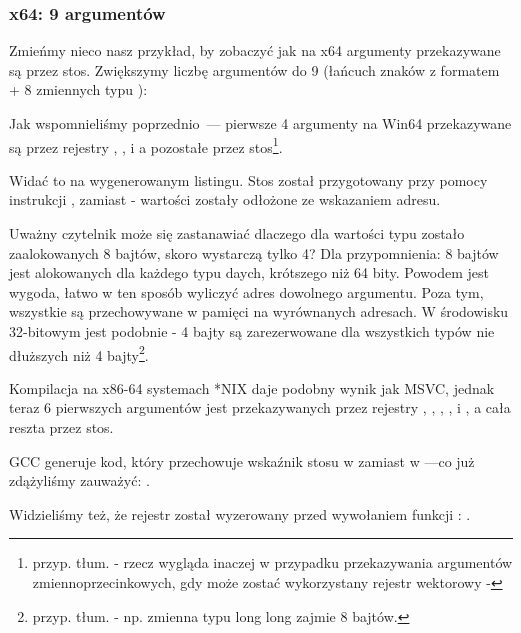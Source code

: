 \subsubsection{x64: 9 argumentów}

\label{example_printf8_x64}
Zmieńmy nieco nasz przykład, by zobaczyć jak na x64 argumenty przekazywane są przez stos.
Zwiększymy liczbę argumentów do 9 (łańcuch znaków z formatem + 8 zmiennych typu \Tint):




Jak wspomnieliśmy poprzednio~--- pierwsze 4 argumenty na Win64 przekazywane są przez rejestry \RCX, \RDX,  i  a pozostałe przez stos\footnote{przyp. tłum. - rzecz wygląda inaczej w przypadku przekazywania argumentów zmiennoprzecinkowych, gdy może zostać wykorzystany rejestr wektorowy -}.

Widać to na wygenerowanym listingu. Stos został przygotowany przy pomocy instrukcji \MOV, zamiast \PUSH - wartości zostały odłożone ze wskazaniem adresu.



Uważny czytelnik może się zastanawiać dlaczego dla wartości typu \Tint zostało zaalokowanych 8 bajtów, skoro wystarczą tylko 4?
Dla przypomnienia: 8 bajtów jest alokowanych dla każdego typu daych, krótszego niż 64 bity.
Powodem jest wygoda, łatwo w ten sposób wyliczyć adres dowolnego argumentu. Poza tym, wszystkie są przechowywane w pamięci na wyrównanych adresach.
W środowisku 32-bitowym jest podobnie - 4 bajty są zarezerwowane dla wszystkich typów nie dłuższych niż 4 bajty\footnote{przyp. tłum. - np. zmienna typu long long zajmie 8 bajtów.}.


Kompilacja na x86-64 systemach *NIX daje podobny wynik jak MSVC, jednak teraz 6 pierwszych argumentów jest przekazywanych przez rejestry \RDI, \RSI,
\RDX, \RCX,  i , a cała reszta przez stos.

GCC generuje kod, który przechowuje wskaźnik stosu w \EDI zamiast w \RDI{}---co już zdążyliśmy zauważyć: .

Widzieliśmy też, że rejestr \EAX został wyzerowany przed wywołaniem funkcji \printf: .

